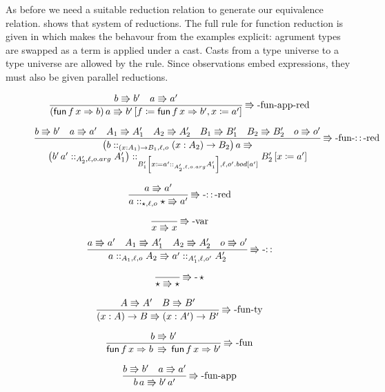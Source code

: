 As before we need a suitable reduction relation to generate our equivalence relation.
 shows that system of reductions.
The full rule for function reduction is given in  which makes the behavour from the examples explicit: agrument types are swapped as a term is applied under a cast.
Casts from a type universe to a type universe are allowed by the  rule.
Since observations embed expressions, they must also be given parallel reductions.

\begin{figure}
\[
\frac{b\Rrightarrow b'\quad a\Rrightarrow a'}{\left(\mathsf{fun}\,f\,x\Rightarrow b\right)a\Rrightarrow b'\left[f\coloneqq\mathsf{fun}\,f\,x\Rightarrow b',x\coloneqq a'\right]}
\operatorname{\Rrightarrow-fun-app-red}
\]

\[
\frac{b\Rrightarrow b'\quad a\Rrightarrow a'\quad A_{1}\Rrightarrow A_{1}'\quad A_{2}\Rrightarrow A_{2}'\quad B_{1}\Rrightarrow B_{1}'\quad B_{2}\Rrightarrow B_{2}'\quad o\Rrightarrow o'}{\begin{array}{c}
\left(b::_{\left(x:A_{1}\right)\rightarrow B_{1},\ell ,o}\left(x:A_{2}\right)\rightarrow B_{2}\right)a\Rrightarrow\\
\left(b'\,a'::_{A_{2}',\ell,o.arg}A_{1}'\right)::_{B_{1}'\left[x\coloneqq a'::_{A_{2}',\ell,o.arg}A_{1}'\right],\ell ,o'.bod[a']}B_{2}'\left[x\coloneqq a'\right]
\end{array}}
\operatorname{\Rrightarrow-fun-::-red}
\]

\[
\frac{a\Rrightarrow a'}{a::_{\star,\ell,o}\star\Rrightarrow a'}
\operatorname{\Rrightarrow-::-red}
\]

\[
\frac{\,}{x\Rrightarrow x}
\operatorname{\Rrightarrow-var}
\]
\[
\frac{a\Rrightarrow a'\quad A_{1}\Rrightarrow A_{1}'\quad A_{2}\Rrightarrow A_{2}'\quad o\Rrightarrow o'}{a::_{A_{1},\ell ,o}A_{2}\Rrightarrow a'::_{A_{1}',\ell ,o'}A_{2}'}
\operatorname{\Rrightarrow-::}
\]

\[
\frac{\,}{\star\Rrightarrow\star}
\operatorname{\Rrightarrow-}\star
\]

\[
\frac{A\Rrightarrow A'\quad B\Rrightarrow B'}{\left(x:A\right)\rightarrow B\Rrightarrow\left(x:A'\right)\rightarrow B'}
\operatorname{\Rrightarrow-fun-ty}
\]

\[
\frac{b\Rrightarrow b'}{\mathsf{fun}\,f\,x\Rightarrow b\,\Rrightarrow\,\mathsf{fun}\,f\,x\Rightarrow b'}
\operatorname{\Rrightarrow-fun}
\]

\[
\frac{b\Rrightarrow b'\quad a\Rrightarrow a'}{b\,a\Rrightarrow b'\,a'}
\operatorname{\Rrightarrow-fun-app}
\]


\end{figure}
